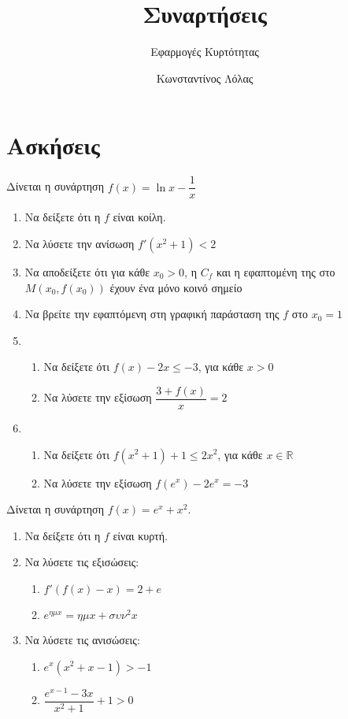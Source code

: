 \documentclass{../presentation}
\title{Συναρτήσεις}
\subtitle{Εφαρμογές Κυρτότητας}
\author[Λόλας]{Κωνσταντίνος Λόλας}
\institute[$10^ο$ ΓΕΛ]{$10^ο$ ΓΕΛ Θεσσαλονίκης}
\begin{document}
\begin{frame}
  \titlepage
\end{frame}

\section{Ασκήσεις}

\begin{askisi}
  Δίνεται η συνάρτηση $f(x)=\ln x-\dfrac{1}{x}$
  \begin{enumerate}[<+->]
    \item Να δείξετε ότι η $f$ είναι κοίλη.
    \item Να λύσετε την ανίσωση $f'(x^2+1)<2$
    \item Να αποδείξετε ότι για κάθε $x_0>0$, η $C_f$ και η εφαπτομένη της στο $Μ(x_0,f(x_0))$ έχουν ένα μόνο κοινό σημείο
    \item Να βρείτε την εφαπτόμενη στη γραφική παράσταση της $f$ στο $x_0=1$
    \item
          \begin{enumerate}[<+->]
            \item Να δείξετε ότι $f(x)-2x\le -3$, για κάθε $x>0$
            \item Να λύσετε την εξίσωση $\dfrac{3+f(x)}{x}=2$
          \end{enumerate}
    \item
          \begin{enumerate}[<+->]
            \item Να δείξετε ότι $f(x^2+1)+1 \le 2x^2$, για κάθε $x\in\mathbb{R}$
            \item Να λύσετε την εξίσωση $f(e^x)-2e^x=-3$
          \end{enumerate}
  \end{enumerate}
\end{askisi}

\begin{askisi}
  Δίνεται η συνάρτηση $f(x)=e^x+x^2$.
  \begin{enumerate}[<+->]
    \item Να δείξετε ότι η $f$ είναι κυρτή.
    \item Να λύσετε τις εξισώσεις:
          \begin{enumerate}[<+->]
            \item $f'(f(x)-x)=2+e$
            \item $e^{ημx}=ημx+συν^2x$
          \end{enumerate}
    \item Να λύσετε τις ανισώσεις:
          \begin{enumerate}[<+->]
            \item $e^x(x^2+x-1)>-1$
            \item $\dfrac{e^{x-1}-3x}{x^2+1}+1>0$
          \end{enumerate}
  \end{enumerate}
\end{askisi}
\end{document}
